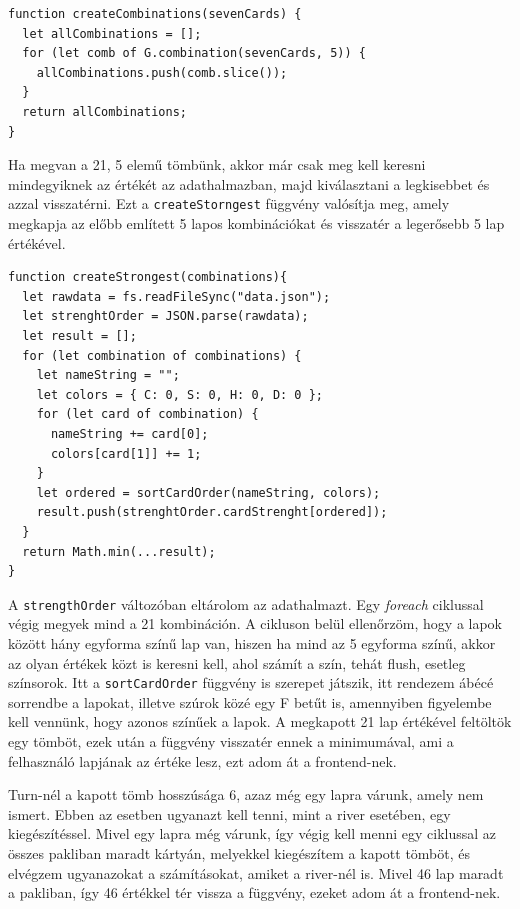 \newpage

\begin{lstlisting}[style=htmlcssjs]
function createCombinations(sevenCards) {
  let allCombinations = [];
  for (let comb of G.combination(sevenCards, 5)) {
    allCombinations.push(comb.slice());
  }
  return allCombinations;
}
\end{lstlisting}

Ha megvan a 21, 5 elemű tömbünk, akkor már csak meg kell keresni mindegyiknek az értékét az adathalmazban, majd kiválasztani a legkisebbet és azzal visszatérni. Ezt a \texttt{createStorngest} függvény valósítja meg, amely megkapja az előbb említett 5 lapos kombinációkat és visszatér a legerősebb 5 lap értékével.

\begin{lstlisting}[style=htmlcssjs]
function createStrongest(combinations){
  let rawdata = fs.readFileSync("data.json");
  let strenghtOrder = JSON.parse(rawdata);
  let result = [];
  for (let combination of combinations) {
    let nameString = "";
    let colors = { C: 0, S: 0, H: 0, D: 0 };
    for (let card of combination) {
      nameString += card[0];
      colors[card[1]] += 1;
    }
    let ordered = sortCardOrder(nameString, colors);
    result.push(strenghtOrder.cardStrenght[ordered]);
  }
  return Math.min(...result);
}
\end{lstlisting}

A \texttt{strengthOrder} változóban eltárolom az adathalmazt. Egy \textit{foreach} ciklussal végig megyek mind a 21 kombináción. A cikluson belül ellenőrzöm, hogy a lapok között hány egyforma színű lap van, hiszen ha mind az 5 egyforma színű, akkor az olyan értékek közt is keresni kell, ahol számít a szín, tehát flush, esetleg színsorok. Itt a \texttt{sortCardOrder} függvény is szerepet játszik, itt rendezem ábécé sorrendbe a lapokat, illetve szúrok közé egy F betűt is, amennyiben figyelembe kell vennünk, hogy azonos színűek a lapok. A megkapott 21 lap értékével feltöltök egy tömböt, ezek után a függvény visszatér ennek a minimumával, ami a felhasználó lapjának az értéke lesz, ezt adom át a frontend-nek.

Turn-nél a kapott tömb hosszúsága 6, azaz még egy lapra várunk, amely nem ismert. Ebben az esetben ugyanazt kell tenni, mint a river esetében, egy kiegészítéssel. Mivel egy lapra még várunk, így végig kell menni egy ciklussal az összes pakliban maradt kártyán, melyekkel kiegészítem a kapott tömböt, és elvégzem ugyanazokat a számításokat, amiket a river-nél is. Mivel 46 lap maradt a pakliban, így 46 értékkel tér vissza a függvény, ezeket adom át a frontend-nek.

